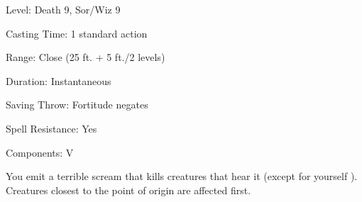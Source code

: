 
\begin{description*}
\item[Level:] Death 9, Sor/Wiz 9
\item[Casting Time:] 1 standard action
\item[Range:] Close (25 ft. + 5 ft./2 levels)
\item[Duration:] Instantaneous
\item[Saving Throw:] Fortitude negates
\item[Spell Resistance:] Yes
\item[Components:] V
\end{description*}

You emit a terrible scream that kills creatures that hear it (except for yourself
). Creatures closest to the point of origin are affected first.